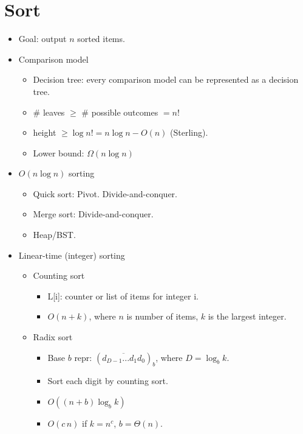 \documentclass[twocolumn]{article}
\begin{document}

\section{Sort}
\begin{itemize}
\item Goal: output $n$ sorted items.
\item Comparison model
  \begin{itemize}
  \item Decision tree: every comparison model can be represented as a decision tree.
  \item \# leaves $\ge$ \# possible outcomes $= n!$
  \item height $\ge \log n! = n \log n - O(n)$ (Sterling).
  \item Lower bound: $\Omega(n \log n)$
  \end{itemize}
\item $O(n \log n)$ sorting
  \begin{itemize}
  \item Quick sort: Pivot. Divide-and-conquer.
  \item Merge sort: Divide-and-conquer.
  \item Heap/BST.
  \end{itemize}
\item Linear-time (integer) sorting
  \begin{itemize}
  \item Counting sort
    \begin{itemize}
    \item L[i]: counter or list of items for integer i.
    \item $O(n+k)$, where $n$ is number of items, $k$ is the largest integer.
    \end{itemize}
  \item Radix sort
    \begin{itemize}
    \item Base $b$ repr: $(\overline{d_{D-1}...d_{1}d_{0}})_b$, where $D=\log_b k$.
    \item Sort each digit by counting sort.
    \item $O((n+b)\log_b k)$
    \item $O(c\,n)$ if $k=n^c$, $b=\Theta(n)$.
    \end{itemize}
  \end{itemize}
\end{itemize}

\end{document}

